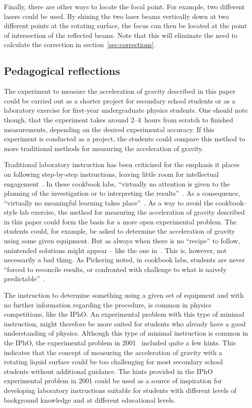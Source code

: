 \documentclass[12pt, a4paper, twocolumn]{article}
\begin{document}
Finally, there are other ways to locate the focal point. For example, two different lasers could be used. By shining the two laser beams vertically down at two different points at the rotating surface, the focus can then be located at the point of intersection of the reflected beams. Note that this will eliminate the need to calculate the correction in section~\ref{sec:corrections}. 

\subsection{Pedagogical reflections}

The experiment to measure the acceleration of gravity described in
this paper could be carried out as a shorter project for secondary
school students or as a laboratory exercise for first-year
undergraduate physics students. One should note though, that the
experiment takes around 2--4~hours from scratch to finished
measurements, depending on the desired experimental accuracy. If this
experiment is conducted as a project, the students could compare this
method to more traditional methods for measuring the acceleration of
gravity.

Traditional laboratory instruction has been criticized for the
emphasis it places on following step-by-step instructions, leaving
little room for intellectual engagement~\cite{Wieman2015}. In these
cookbook labs, ``virtually no attention is given to the planning of
the investigation or to interpreting the
results''~\cite{Domin1999}. As a consequence, ``virtually no
meaningful learning takes place''~\cite{Domin1999}. As a way to avoid
the cookbook-style lab exercise, the method for measuring the
acceleration of gravity described in this paper could form the basis
for a more open experimental problem. The students could, for example,
be asked to determine the acceleration of gravity using some given
equipment. But as always when there is no ``recipe'' to follow,
unintended solutions might appear – like the one
in~\cite{IPhO2001}. This is, however, not necessarily a bad thing. As
Pickering noted, in cookbook labs, students are never ``forced to
reconcile results, or confronted with challenge to what is naively
predictable''~\cite{Pickering1987}.

The instruction to determine something using a given set of equipment
and with no further information regarding the procedure, is common in
physics competitions, like the IPhO. An experimental problem with this
type of minimal instruction, might therefore be more suited for
students who already have a good understanding of physics. Although
this type of minimal instruction is common in the IPhO, the
experimental problem in 2001~\cite{IPhO2001} included quite a few
hints. This indicates that the concept of measuring the acceleration
of gravity with a rotating liquid surface could be too challenging for
most secondary school students without additional guidance. The hints
provided in the IPhO experimental problem in 2001 could be used as a
source of inspiration for developing laboratory instructions suitable
for students with different levels of background knowledge and at
different educational levels. 
\end{document}
